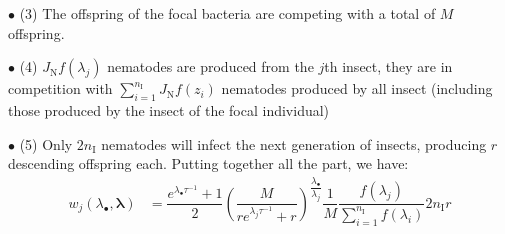 \documentclass{article}
\newcommand{\nI}{{n_\textrm{I}}}
\begin{document}
 
 $\bullet$ (3) The offspring of the focal bacteria are competing with a total of $M$ offspring.
 
 
 $\bullet$ (4) $J_{\mathrm{N}} f(\lambda_j)$ nematodes are produced from the $j$th insect, they are in competition with $\sum_{i=1}^{\nI} J_\mathrm{N} f(z_i)$ nematodes produced by all insect (including those produced by the insect of the focal individual)
 
 
 $\bullet$ (5) Only $2 \nI$ nematodes will infect the next generation of insects, producing $r$ descending offspring each.
 Putting together all the part, we have: 
 \begin{align}
 w_j(\lambda_\bullet , \mathbf{\lambda} ) &= \dfrac{e^{\lambda_\bullet\tau^{-1}}+1}{2} \left( \dfrac{M}{re^{\lambda_j\tau^{-1}}+r} \right)^{\dfrac{\lambda_\bullet }{\lambda_j}} \dfrac{1}{M}\dfrac{  f ( \lambda_j )}{\sum_{i=1}^\nI f ( \lambda_i )} 2\nI r  \\
 \end{align} 
\end{document}
